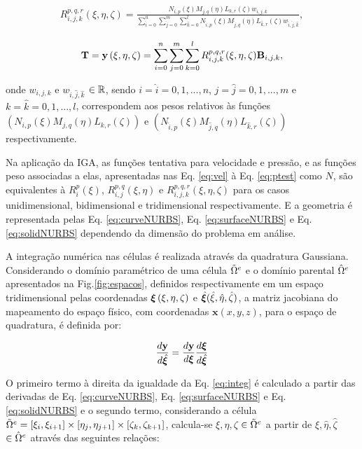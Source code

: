 \documentclass[tese_patricia]{subfiles}
\begin{document}
\begin{align}
R_{i,j,k}^{p,q,r}(\xi,\eta,\zeta) = \frac{N_{i,p}(\xi)M_{j,q}(\eta)L_{k,r}(\zeta)w_{i,j,k}}
{\sum_{\hat{i}=0}^{n}\sum_{\hat{j}=0}^{m}\sum_{\hat{k}=0}^{l}N_{\hat{i},p}(\xi)M_{\hat{j},q}(\eta)L_{\hat{k},r}(\zeta)w_{\hat{i},\hat{j},\hat{k}}},
\end{align}

\begin{align}
\mathbf{T} = \mathbf{y}\left(\xi,\eta,\zeta\right) = \sum_{i=0}^{n}\sum_{j=0}^{m}\sum_{k=0}^{l}R_{i,j,k}^{p,q,r}(\xi,\eta,\zeta)\mathbf{B}_{i,j,k}, \label{eq:solidNURBS}
\end{align}

\noindent onde $w_{i,j,k}$ e $w_{\hat{i},\hat{j},\hat{k}}$ $\in \mathbb{R}$, sendo $i = \hat{i} =  0, 1, ... , n$, $j = \hat{j} =  0, 1, ... , m$ e $k = \hat{k} =  0, 1, ... , l$, correspondem aos pesos relativos às funções $\left(N_{i,p}\left(\xi\right)M_{j,q}\left(\eta\right)L_{k,r}\left(\zeta\right)\right)$ e $(N_{\hat{i},p}\left(\xi\right)M_{\hat{j},q}\left(\eta\right)L_{\hat{k},r}\left(\zeta\right))$ respectivamente.

Na aplicação da IGA, as funções tentativa para velocidade e pressão, e as funções peso associadas a elas, apresentadas nas Eq. \eqref{eq:vel} à Eq. \eqref{eq:ptest} como $N$, são equivalentes à $R_{i}^{p}(\xi)$, $R_{i,j}^{p,q}(\xi,\eta)$ e $R_{i,j,k}^{p,q,r}(\xi,\eta,\zeta)$ para os casos unidimensional, bidimensional e tridimensional respectivamente. E a geometria é representada pelas Eq. \eqref{eq:curveNURBS}, Eq. \eqref{eq:surfaceNURBS} e Eq. \eqref{eq:solidNURBS} dependendo da dimensão do problema em análise. 

A integração numérica nas células é realizada através da quadratura Gaussiana. Considerando o domínio paramétrico de uma célula $\tilde{\Omega}^{e}$ e o domínio parental $\hat{\Omega}^{e}$  apresentados na Fig.\ref{fig:espacos}, definidos respectivamente em um espaço tridimensional pelas coordenadas $\bm{\xi}\left(\xi,\eta,\zeta\right)$ e $\hat{\bm{\xi}}(\hat{\xi},\hat{\eta},\hat{\zeta})$, a matriz jacobiana do mapeamento do espaço físico, com coordenadas $\mathbf{x} \left(x,y,z\right)$,  para o espaço de quadratura, é definida por:

\begin{align}
\frac{d\mathbf{y}}{d\hat{\bm{\xi}}} = \frac{d\mathbf{y}}{d\bm{\xi}} \frac{d\bm{\xi}}{d\hat{\bm{\xi}}} \label{eq:integ}
\end{align}

O primeiro termo à direita da igualdade da Eq. \eqref{eq:integ} é calculado a partir das derivadas de Eq. \eqref{eq:curveNURBS}, Eq. \eqref{eq:surfaceNURBS} e Eq. \eqref{eq:solidNURBS} e o segundo termo, considerando a célula $\tilde{\Omega}^{e} = [\xi_{i},\xi_{i+1}] \times [\eta_{j},\eta_{j+1}] \times [\zeta_{k},\zeta_{k+1}]$, calcula-se $\xi,\eta, \zeta$ $\in \tilde{\Omega}^{e}$ a partir de $\hat{\xi},\hat{\eta}, \hat{\zeta}$ $\in \hat{\Omega}^{e}$ através das seguintes relações: 
\end{document}
